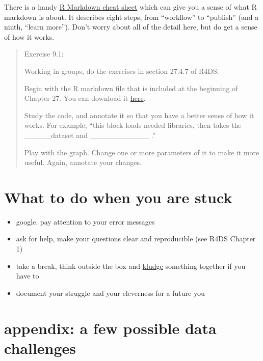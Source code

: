 \documentclass[
  openany]{book}
\begin{document}
There is a handy \href{https://www.rstudio.com/wp-content/uploads/2015/02/rmarkdown-cheatsheet.pdf}{R Markdown cheat sheet} which can give you a sense of what R markdown is about. It describes eight steps, from ``workflow'' to ``publish'' (and a ninth, ``learn more''). Don't worry about all of the detail here, but do get a sense of how it works.

\begin{quote}
Exercise 9.1:

Working in groups, do the exercises in section 27.4.7 of R4DS.

Begin with the R markdown file that is included at the beginning of Chapter 27. You can download it \href{https://raw.githubusercontent.com/hadley/r4ds/master/rmarkdown/diamond-sizes.Rmd}{here}.

Study the code, and annotate it so that you have a better sense of how it works. For example, ``this block loads needed libraries, then takes the \_\_\_\_\_dataset and \_\_\_\_\_\_\_\_\_\_\_ .''

Play with the graph. Change one or more parameters of it to make it more useful. Again, annotate your changes.
\end{quote}

\hypertarget{what-to-do-when-you-are-stuck}{%
\section{What to do when you are stuck}\label{what-to-do-when-you-are-stuck}}

\begin{itemize}
\item
  google. pay attention to your error messages
\item
  ask for help, make your questions clear and reproducible (see R4DS Chapter 1)
\item
  take a break, think outside the box and \href{https://www.google.com/search?newwindow=1\&safe=active\&rlz=1C1SQJL_enUS782US782\&q=Dictionary\#dobs=kludge}{kludge} something together if you have to
\item
  document your struggle and your cleverness for a future you
\end{itemize}

\hypertarget{appendix-a-few-possible-data-challenges}{%
\section{appendix: a few possible data challenges}\label{appendix-a-few-possible-data-challenges}}
\end{document}

